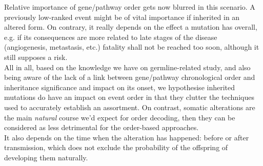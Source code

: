 Relative importance of gene/pathway order gets now blurred in this scenario. A previously low-ranked event might be of vital importance if inherited in an altered form. On contrary, it really depends on the effect a mutation has overall, e.g. if its consequences are more related to late stages of the disease (angiogenesis, metastasis, etc.) fatality shall not be reached too soon, although it still supposes a risk.
\\

All in all, based on the knowledge we have on germline-related study, and also being aware of the lack of a link between gene/pathway chronological order and inheritance significance and impact on its onset, we hypothesise inherited mutations do have an impact on event order in that they clutter the techniques used to accurately establish an assortment. On contrast, somatic alterations are the main \emph{natural} course we'd expect for order decoding, then they can be considered as less detrimental for the order-based approaches.
\\

It also depends on the time when the alteration has happened: before or after transmission, which does not exclude the probability of the offspring of developing them naturally.
